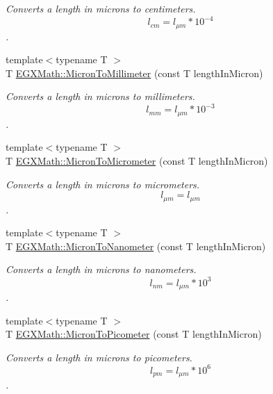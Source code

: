 \begin{DoxyCompactItemize}
\begin{DoxyCompactList}\small\item\em Converts a length in microns to centimeters. \[ l_{cm}=l_{\mu m} * 10^{-4} \]. \end{DoxyCompactList}\item 
{\footnotesize template$<$typename T $>$ }\\T \mbox{\hyperlink{group___e_g_x_math-_conversions-_length_conversions-_non-_s_i-_micron-_s_i_ga6dc810fc8f42b1a261023a8529eb68c3}{E\+G\+X\+Math\+::\+Micron\+To\+Millimeter}} (const T length\+In\+Micron)
\begin{DoxyCompactList}\small\item\em Converts a length in microns to millimeters. \[ l_{mm}=l_{\mu m} * 10^{-3} \]. \end{DoxyCompactList}\item 
{\footnotesize template$<$typename T $>$ }\\T \mbox{\hyperlink{group___e_g_x_math-_conversions-_length_conversions-_non-_s_i-_micron-_s_i_gaf65c3c52f13b30b32ae35c4b8edc30a8}{E\+G\+X\+Math\+::\+Micron\+To\+Micrometer}} (const T length\+In\+Micron)
\begin{DoxyCompactList}\small\item\em Converts a length in microns to micrometers. \[ l_{\mu m}=l_{\mu m} \]. \end{DoxyCompactList}\item 
{\footnotesize template$<$typename T $>$ }\\T \mbox{\hyperlink{group___e_g_x_math-_conversions-_length_conversions-_non-_s_i-_micron-_s_i_ga6006dadf7b1a114319bf3b5768f7ef90}{E\+G\+X\+Math\+::\+Micron\+To\+Nanometer}} (const T length\+In\+Micron)
\begin{DoxyCompactList}\small\item\em Converts a length in microns to nanometers. \[ l_{nm}=l_{\mu m} * 10^{3} \]. \end{DoxyCompactList}\item 
{\footnotesize template$<$typename T $>$ }\\T \mbox{\hyperlink{group___e_g_x_math-_conversions-_length_conversions-_non-_s_i-_micron-_s_i_ga6e091e653fd9efb8769cc131fcbc41bc}{E\+G\+X\+Math\+::\+Micron\+To\+Picometer}} (const T length\+In\+Micron)
\begin{DoxyCompactList}\small\item\em Converts a length in microns to picometers. \[ l_{pm}=l_{\mu m} * 10^{6} \]. \end{DoxyCompactList}\item 

\end{DoxyCompactItemize}
